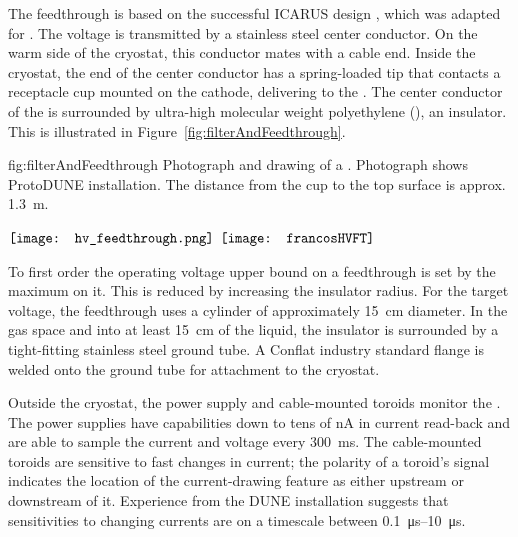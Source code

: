 The  feedthrough %
is based on the successful ICARUS design \cite{Icarus-T600}, %
which was adapted for .  The voltage is transmitted by a stainless steel center conductor.  On the warm side of the cryostat, this conductor mates with a cable end.  Inside the cryostat, the end of the center conductor has a spring-loaded tip that %
contacts a receptacle cup mounted on the cathode, delivering  to the .  The center conductor of the \fdth is surrounded by ultra-high molecular weight polyethylene (), an insulator. This is illustrated in Figure~\ref{fig:filterAndFeedthrough}.

\begin{dunefigure}{fig:filterAndFeedthrough}
{Photograph and drawing of a  \fdth{}. Photograph shows ProtoDUNE installation. The distance from the cup to the top surface is approx. \SI{1.3}{\meter}. } %
\begin{minipage}{\textwidth}%
  \centering
 $\vcenter{\hbox{\texttt{[image: hv\_feedthrough.png]}}}$
 \hspace*{0.001\textwidth}  $\vcenter{\hbox{\texttt{[image: francosHVFT]}}}$
\end{minipage}
\end{dunefigure}

To first order the operating voltage upper bound on a feedthrough is set by the maximum \efield{} on it. %
This \efield{} is reduced by increasing the insulator radius.  For the target voltage, the feedthrough uses a  cylinder of approximately \SI{15}{cm} diameter.  In the gas space and into at least \SI{15}{\centi\meter} of the liquid, the insulator is surrounded by a tight-fitting stainless steel ground tube.  A %
Conflat industry standard flange is welded onto the ground tube for attachment to the cryostat.

Outside the cryostat, the  power supply and cable-mounted toroids monitor the .    The power supplies 
have capabilities down to tens of \si{\nano\ampere} in current read-back 
and are able to sample the current and voltage every \SI{300}{\ms}.  The cable-mounted toroids are sensitive to fast changes in current;  
the polarity of a toroid's signal  
indicates the location of the current-drawing feature as either upstream or downstream of it.  Experience from the DUNE  installation suggests that sensitivities to changing currents %
are on a timescale between \SIrange{0.1}{10}{\micro\s}.


